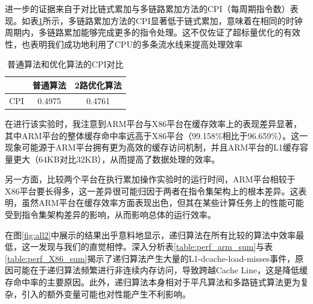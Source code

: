 \documentclass[a4paper]{article}
\begin{document}
进一步的证据来自于对比链式累加与多链路累加方法的CPI（每周期指令数）表现。如表\ref{tab:cpi1}所示，多链路累加方法的CPI显著低于链式累加，意味着在相同的时钟周期内，多链路累加能够完成更多的指令处理。这不仅佐证了超标量优化的有效性，也表明我们成功地利用了CPU的多条流水线来提高处理效率
                    \begin{table}[htbp]
                    \centering
                    \caption{普通算法和优化算法的CPI对比}
                    \label{tab:cpi1}
                    \begin{tabular}{@{}lcc@{}}
                    \toprule
                     & 普通算法  & 2路优化算法 \\ \midrule
                    CPI & 0.4975 & 0.4761 \\ \bottomrule
                    \end{tabular}
                    \end{table}
                    

在进行该实验时，我注意到ARM平台与X86平台在缓存效率上的表现差异显著，其中ARM平台的整体缓存命中率远高于X86平台（99.158\%相比于96.659\%）。这一现象可能源于ARM平台拥有更为高效的缓存访问机制，并且ARM平台的L1缓存容量更大（64KB对比32KB），从而提高了数据处理的效率。

另一方面，比较两个平台在执行累加操作实验时的运行时间，ARM平台相较于X86平台要长得多，这一差异很可能归因于两者在指令集架构上的根本差异。这表明，虽然ARM平台在缓存效率方面表现出色，但其在某些计算任务上的性能可能受到指令集架构差异的影响，从而影响总体的运行效率。


在图\ref{fig:all2}中展示的结果出乎意料地显示，递归算法在所有比较的算法中效率最低，这一发现与我们的直觉相悖。深入分析表\ref{table:perf_arm_sum}与表\ref{table:perf_X86_sum}揭示了递归算法产生大量的L1-dcache-load-misses事件，原因可能在于递归算法频繁进行非连续内存访问，导致跨越Cache Line，这是降低缓存命中率的主要原因。此外，递归算法本身相对于平凡算法和多路链式算法更为复杂，引入的额外变量可能也对性能产生不利影响。
\end{document}
